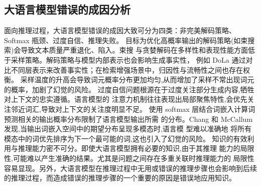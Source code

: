 \subsection{大语言模型错误的成因分析}
面向推理过程，大语言模型错误的成因大致可分为四类：非完美解码策略、Softmax
瓶颈、过度自信、推理失败。
目标为优化高概率输出的解码策略(如束搜索)会导致文本质量严重退化、陷入。束搜
与贪婪解码在多样性和表现性能方面低于采样策略\cite{ref17_holtzman2020curious}。解码策略与模型内部表示也会影响生成事实性，
例如 DoLa 通过对比不同层表示来改善事实性\cite{ref18_chuang2023dola}；在检索增强场景中，归因性与流畅性之间也存在权衡\cite{ref19_aksitov2023characterizing}。
采样温度的升高会导致词元概率分布更加均匀,从而增加了采样不常出现词元的概率，加剧了幻觉的风险。
过度自信问题根源在于过度关注部分生成内容,牺牲对上下文的忠实遵循。语言模型的
注意力机制往往表现出局部聚焦特性,会优先关注邻近词汇,导致对上下文的关注度明显不足\cite{ref20_shi2023trusting}。
使用 softmax 层结合词嵌入计算词预测相关的输出概率分布限制了语言模型输出所需
的分布。Chang 和 McCallum\cite{ref21_chang2022softmax}发现,当输出词嵌入空间中的期望分布呈现多模态时,语言模
型难以准确地 将所有模态中的词优先排序为下一个最可能的词,这也引入了幻觉的风险。
知识的有效利用与推理能力密不可分。即使大语言模型拥有必要的知识,由于其推理
能力的局限性\cite{ref22_zheng2023why},可能难以产生准确的结果。尤其是问题之间存在多重关联时推理能力的
局限性容易显现。另外，大语言模型在推理过程中无用或错误的推理步骤也会影响到后续
的推理过程，而造成错误的推理步骤的一个重要的原因是错误地应用知识。




